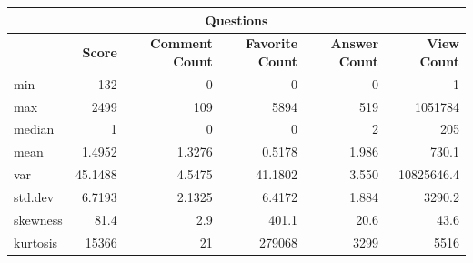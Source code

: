 \documentclass{article}
\begin{document}
\begin{tabular}[t]{| l | r |r|r|r|r|} \hline
\multicolumn{6}{|c|}{Questions} \\ \hline
& \bf{Score} & \bf{Comment Count} & \bf{Favorite Count} & \bf{Answer Count} & \bf{View Count} \\ \hline
min  &           -132 &       0 &        0 &       0 &        1 \\ \hline
max  &           2499 &     109 &     5894 &     519 &  1051784 \\ \hline
median &            1 &       0 &        0 &       2 &      205 \\ \hline
mean  &             1.4952 &       1.3276 &        0.5178 &       1.986 &      730.1 \\ \hline
var   &            45.1488 &       4.5475 &       41.1802 &       3.550 & 10825646.4 \\ \hline
std.dev  &          6.7193 &       2.1325 &        6.4172 &       1.884 &     3290.2 \\ \hline
skewness & 81.4  &          2.9  &        401.1  &         20.6  &         43.6  \\ \hline
kurtosis & 15366   &          21  &       279068   &        3299    &       5516 \\ \hline
\end{tabular}
\end{document}
